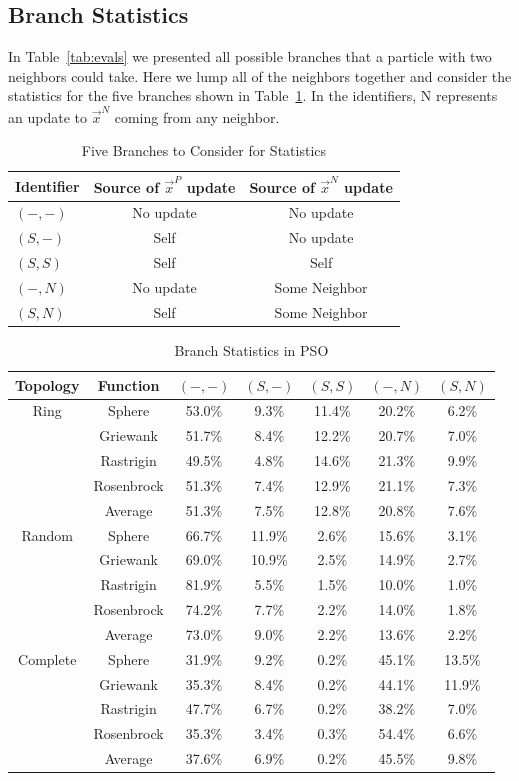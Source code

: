 \documentclass[journal,letterpaper]{IEEEtran}
\providecommand{\pers}{\ensuremath{P}}
\providecommand{\neigh}{\ensuremath{N}}
\providecommand{\nbest}{\ensuremath{\Vec{x}^\neigh}}
\providecommand{\pbest}{\ensuremath{\Vec{x}^\pers}}
\providecommand{\casexn}{\ensuremath{(S,-)}}
\providecommand{\casexx}{\ensuremath{(S,S)}}
\providecommand{\casepn}{\ensuremath{(-,-)}}
\providecommand{\casepN}{\ensuremath{(-,N)}}
\providecommand{\casexN}{\ensuremath{(S,N)}}
\begin{document}
\subsection{Branch Statistics}

In Table~\ref{tab:evals} we presented all possible branches that a particle
with two neighbors could take.  Here we lump all of the neighbors together and
consider the statistics for the five branches shown in
Table~\ref{tab:branches}.  In the identifiers, N represents an update to
$\nbest$ coming from any neighbor.

\begin{table}[ht]
  \caption{Five Branches to Consider for Statistics}
  \label{tab:branches}
  \centering
  \begin{tabular}{lcc}
	Identifier&Source of $\pbest$ update&Source of $\nbest$ update\\
	\hline
	\hline
	$\casepn$&No update&No update\\
	\hline
	$\casexn$&Self&No update\\
	\hline
	$\casexx$&Self&Self\\
	\hline
	$\casepN$&No update&Some Neighbor\\
	\hline
	$\casexN$&Self&Some Neighbor\\
	\hline
  \end{tabular}
\end{table}

\begin{table}[ht]
  \caption{Branch Statistics in PSO}
  \label{tab:stats}
  \centering
  \scriptsize
  \begin{tabular}{c|c|c|c|c|c|c}
	Topology&Function&\casepn&\casexn&\casexx&\casepN&\casexN\\
	\hline
	\hline
	Ring&Sphere&53.0\%&9.3\%&11.4\%&20.2\%&6.2\%\\
	&Griewank&51.7\%&8.4\%&12.2\%&20.7\%&7.0\%\\
	&Rastrigin&49.5\%&4.8\%&14.6\%&21.3\%&9.9\%\\
	&Rosenbrock&51.3\%&7.4\%&12.9\%&21.1\%&7.3\%\\
	\cline{2-7}
	&Average&{51.3\%}&{7.5\%}&{12.8\%}&{20.8\%}&
	{7.6\%}\\
	\hline
	\hline
	Random&Sphere&66.7\%&11.9\%&2.6\%&15.6\%&3.1\%\\
	&Griewank&69.0\%&10.9\%&2.5\%&14.9\%&2.7\%\\
	&Rastrigin&81.9\%&5.5\%&1.5\%&10.0\%&1.0\%\\
	&Rosenbrock&74.2\%&7.7\%&2.2\%&14.0\%&1.8\%\\
	\cline{2-7}
	&Average&{73.0\%}&{9.0\%}&{2.2\%}&{13.6\%}&
	{2.2\%}\\
	\hline
	\hline
	Complete&Sphere&31.9\%&9.2\%&0.2\%&45.1\%&13.5\%\\
	&Griewank&35.3\%&8.4\%&0.2\%&44.1\%&11.9\%\\
	&Rastrigin&47.7\%&6.7\%&0.2\%&38.2\%&7.0\%\\
	&Rosenbrock&35.3\%&3.4\%&0.3\%&54.4\%&6.6\%\\
	\cline{2-7}
	&Average&{37.6\%}&{6.9\%}&{0.2\%}&{45.5\%}&
	{9.8\%}\\
	\hline
  \end{tabular}
\end{table}
\end{document}
